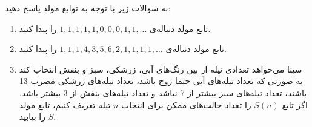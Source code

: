         به سوالات زیر با توجه به توابع مولد پاسخ دهید:
        \begin{enumerate}
            \item 
                تابع مولد دنباله‌ی 
                ${1,1,1,1,1,0,0,0,1,1,\ldots}$
                را پیدا کنید.
            \item
                تابع مولد دنباله‌ی
                ${1,1,1,4,3,5,6,2,1,1,1,1,\ldots}$
                را پیدا کنید.
            \item 
                سینا می‌خواهد تعدادی تیله از بین رنگ‌های آبی، زرشکی، سبز و بنفش انتخاب کند به صورتی که تعداد تیله‌های آبی حتما زوج باشد، تعداد تیله‌های زرشکی مضرب 13 باشند، تعداد تیله‌های سبز بیشتر از 7 نباشد و تعداد تیله‌های بنفش از 3 بیشتر باشد. اگر تابع $S(n)$ را تعداد حالت‌های ممکن برای انتخاب $n$ تیله تعریف کنیم، تابع مولد $S$ را بیابید.
        \end{enumerate}
